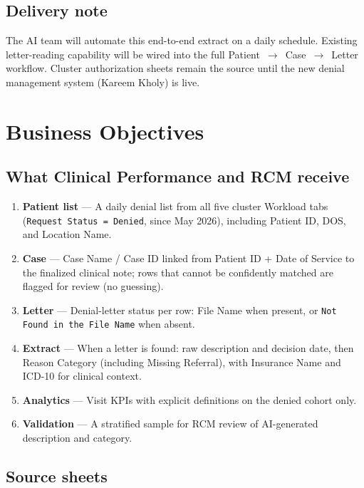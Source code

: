 \documentclass[11pt,a4paper]{article}
\begin{document}
\subsection{Delivery note}

The AI team will automate this end-to-end extract on a daily schedule. Existing
letter-reading capability will be wired into the full Patient~$\rightarrow$~Case~$\rightarrow$~Letter
workflow. Cluster authorization sheets remain the source until the new denial management
system (Kareem Kholy) is live.


\section{Business Objectives}

\subsection{What Clinical Performance and RCM receive}

\begin{enumerate}
  \item \textbf{Patient list} --- A daily denial list from all five cluster Workload tabs
        (\texttt{Request Status = Denied}, since May 2026), including Patient ID, DOS, and
        Location Name.
  \item \textbf{Case} --- Case Name / Case ID linked from Patient ID + Date of Service to
        the finalized clinical note; rows that cannot be confidently matched are flagged
        for review (no guessing).
  \item \textbf{Letter} --- Denial-letter status per row: File Name when present, or
        \texttt{Not Found in the File Name} when absent.
  \item \textbf{Extract} --- When a letter is found: raw description and decision date,
        then Reason Category (including Missing Referral), with Insurance Name and ICD-10
        for clinical context.
  \item \textbf{Analytics} --- Visit KPIs with explicit definitions on the denied cohort only.
  \item \textbf{Validation} --- A stratified sample for RCM review of AI-generated
        description and category.
\end{enumerate}

\subsection{Source sheets}
\end{document}
